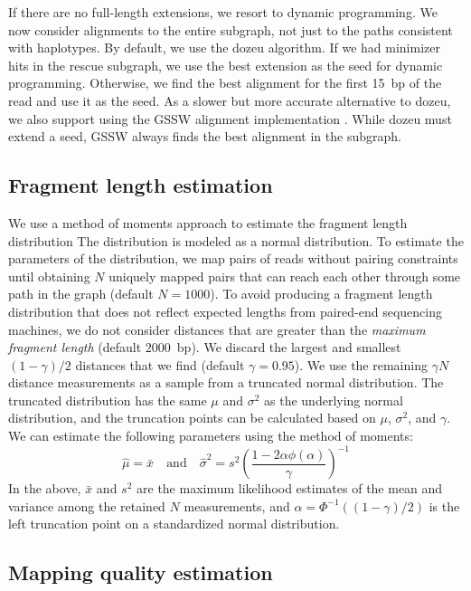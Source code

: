 \documentclass[11pt]{ucscthesis}
\newcommand{\param}[1]{\emph{#1}}
\begin{document}
If there are no full-length extensions, we resort to dynamic programming.
We now consider alignments to the entire subgraph, not just to the paths consistent with haplotypes.
By default, we use the dozeu algorithm.
If we had minimizer hits in the rescue subgraph, we use the best extension as the seed for dynamic programming.
Otherwise, we find the best alignment for the first 15~bp of the read and use it as the seed.
As a slower but more accurate alternative to dozeu, we also support using the GSSW alignment implementation \cite{zhao_gssw_2013}.
While dozeu must extend a seed, GSSW always finds the best alignment in the subgraph.


\subsection{Fragment length estimation}
\label{subsec:aim2:fragment-length}

We use a method of moments approach to estimate the fragment length distribution
The distribution is modeled as a normal distribution.
To estimate the parameters of the distribution, we map pairs of reads without pairing constraints until obtaining $N$ uniquely mapped pairs that can reach each other through some path in the graph (default $N = 1000$).
To avoid producing a fragment length distribution that does not reflect expected lengths from paired-end sequencing machines, we do not consider distances that are greater than the \param{maximum fragment length} (default $2000$~bp).
We discard the largest and smallest $(1 - \gamma) / 2$ distances that we find (default $\gamma = 0.95$).
We use the remaining $\gamma N$ distance measurements as a sample from a truncated normal distribution.
The truncated distribution has the same $\mu$ and $\sigma^{2}$ as the underlying normal distribution, and the truncation points can be calculated based on $\mu$, $\sigma^{2}$, and $\gamma$.
We can estimate the following parameters using the method of moments:
$$
\hat{\mu} = \bar{x} \quad \textrm{and} \quad
\hat{\sigma}^{2} = s^{2} \left( \frac{1 - 2 \alpha \phi(\alpha)}{\gamma} \right)^{-1}
$$
In the above, $\bar{x}$ and $s^{2}$ are the maximum likelihood estimates of the mean and variance among the retained $N$ measurements, and $\alpha = \Phi^{-1}((1 - \gamma) / 2)$ is the left truncation point on a standardized normal distribution.


\subsection{Mapping quality estimation}
\end{document}
